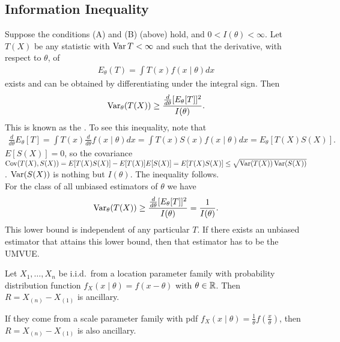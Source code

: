 \subsection{Information Inequality}
Suppose the conditions (A) and (B) (above) hold, and $0 < I(\theta) < \infty$. Let $T(X)$ be any statistic with $\operatorname{Var} T < \infty$ and such that the derivative, with respect to $\theta$, of
\begin{align}
    E_{\theta}(T) = \int T(x)f(x \mid \theta) dx
\end{align}
exists and can be obtained by differentiating under the integral sign. Then
\begin{align}
    \operatorname{Var}_{\theta}(T(X)) \geq \frac{\frac{d}{d\theta}[E_{\theta}[T]]^{2}}{I(\theta)}.
\end{align}
This is known as the . To see this inequality, note that
\begin{align}
    \frac{d}{d \theta} E_{\theta}[T] = \int T(x) \frac{d}{d\theta}f(x \mid \theta) dx = \int T(x) S(x) f(x \mid \theta) dx = E_{\theta}[T(X)S(X)].
\end{align}
$E[S(X)] = 0$, so the covariance $\operatorname{Cov}(T(X),S(X)) = E[T(X)S(X)] -E[T(X)]E[S(X)] = E[T(X)S(X)] \leq \sqrt{\operatorname{Var}(T(X)) \operatorname{Var}(S(X))}$. $\operatorname{Var}(S(X))$ is nothing but $I(\theta)$. The inequality follows.\\

For the class of all unbiased estimators of $\theta$ we have
\begin{align}
    \operatorname{Var}_{\theta}(T(X)) \geq \frac{\frac{d}{d\theta}[E_{\theta}[T]]^{2}}{I(\theta)} = \frac{1}{I(\theta)}.
\end{align}
This lower bound is independent of any particular $T$. If there exists an unbiased estimator that attains this lower bound, then that estimator has to be the UMVUE.

\begin{remark}
    Let $X_{1},\ldots,X_{n}$ be i.i.d.~from a location parameter family with probability distribution function $f_{X}(x \mid \theta) = f(x-\theta)$ with $\theta \in \mathbb{R}$. Then $R = X_{(n)}-X_{(1)}$ is ancillary.

    If they come from a scale parameter family with pdf $f_{X}(x \mid \theta) = \frac{1}{\theta}f\left(\frac{x}{\theta}\right)$, then $R = X_{(n)}-X_{(1)}$ is also ancillary.
\end{remark}